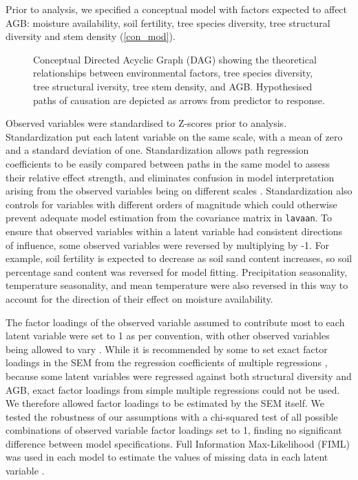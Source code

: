 \documentclass[11pt,a4paper]{article}
\begin{document}
Prior to analysis, we specified a conceptual model with factors expected to affect AGB: moisture availability, soil fertility, tree species diversity, tree structural diversity and stem density (\autoref{con_mod}). 

\begin{figure}[H]
\centering
	
	\caption{Conceptual Directed Acyclic Graph (DAG) showing the theoretical relationships between environmental factors, tree species diversity, tree structural iversity, tree stem density, and AGB. Hypothesised paths of causation are depicted as arrows from predictor to response.}
	\label{con_mod}
\end{figure}

Observed variables were standardised to Z-scores prior to analysis. Standardization put each latent variable on the same scale, with a mean of zero and a standard deviation of one. Standardization allows path regression coefficients to be easily compared between paths in the same model to assess their relative effect strength, and eliminates confusion in model interpretation arising from the observed variables being on different scales \citep{Beaujean2014}. Standardization also controls for variables with different orders of magnitude which could otherwise prevent adequate model estimation from the covariance matrix in \verb|lavaan|. To ensure that observed variables within a latent variable had consistent directions of influence, some observed variables were reversed by multiplying by -1. For example, soil fertility is expected to decrease as soil sand content increases, so soil percentage sand content was reversed for model fitting. Precipitation seasonality, temperature seasonality, and mean temperature were also reversed in this way to account for the direction of their effect on moisture availability.

The factor loadings of the observed variable assumed to contribute most to each latent variable were set to 1 as per convention, with other observed variables being allowed to vary \citep{Beaujean2014}. While it is recommended by some to set exact factor loadings in the SEM from the regression coefficients of multiple regressions \citep{lavaan}, because some latent variables were regressed against both structural diversity and AGB, exact factor loadings from simple multiple regressions could not be used. We therefore allowed factor loadings to be estimated by the SEM itself. We tested the robustness of our assumptions with a chi-squared test of all possible combinations of observed variable factor loadings set to 1, finding no significant difference between model specifications. Full Information Max-Likelihood (FIML) was used in each model to estimate the values of missing data in each latent variable \citep{Cham2017}.
\end{document}
